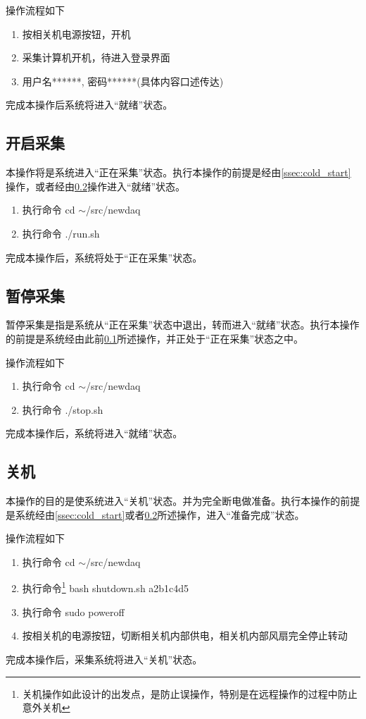 \documentclass[11pt,includemp,a4paper]{article}
\begin{document}
操作流程如下
\begin{enumerate}
    \item 按相关机电源按钮，开机
    \item 采集计算机开机，待进入登录界面
    \item 用户名******, 密码******(具体内容口述传达)
\end{enumerate}
完成本操作后系统将进入“就绪”状态。

\subsection{开启采集}
\label{ssec:daq}
本操作将是系统进入“正在采集”状态。执行本操作的前提是经由\ref{ssec:cold_start}操作，或者经由\ref{ssec:stop}操作进入“就绪”状态。
\begin{enumerate}
    \item 执行命令 cd $\sim$/src/newdaq
    \item 执行命令 ./run.sh
\end{enumerate}
完成本操作后，系统将处于“正在采集”状态。

\subsection{暂停采集}
\label{ssec:stop}
暂停采集是指是系统从“正在采集”状态中退出，转而进入“就绪”状态。执行本操作的前提是系统经由此前\ref{ssec:daq}所述操作，并正处于“正在采集”状态之中。

操作流程如下
\begin{enumerate}
    \item 执行命令 cd $\sim$/src/newdaq
    \item 执行命令 ./stop.sh
\end{enumerate}
完成本操作后，系统将进入“就绪”状态。

\subsection{关机}
\label{ssec:shutdown}
本操作的目的是使系统进入“关机”状态。并为完全断电做准备。执行本操作的前提是系统经由\ref{ssec:cold_start}或者\ref{ssec:stop}所述操作，进入“准备完成”状态。

操作流程如下
\begin{enumerate}
    \item 执行命令 cd $\sim$/src/newdaq
    \item 执行命令\footnote{关机操作如此设计的出发点，是防止误操作，特别是在远程操作的过程中防止意外关机} bash shutdown.sh a2b1c4d5
    \item 执行命令 sudo poweroff
    \item 按相关机的电源按钮，切断相关机内部供电，相关机内部风扇完全停止转动
\end{enumerate}
完成本操作后，采集系统将进入“关机”状态。
\end{document}
